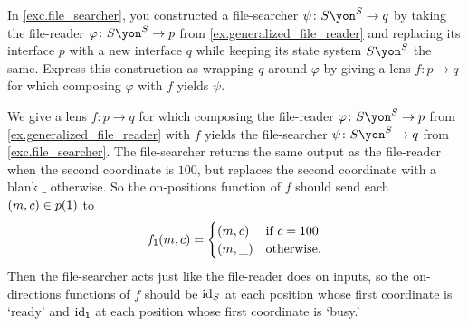 \documentclass[Book-Poly]{subfiles}
\begin{document}
\begin{exercise} \label{exc.file_searcher_wrap}
In \cref{exc.file_searcher}, you constructed a file-searcher $\psi\colon S\yon^S\to q$ by taking the file-reader $\varphi\colon S\yon^S\to p$ from \cref{ex.generalized_file_reader} and replacing its interface $p$ with a new interface $q$ while keeping its state system $S\yon^S$ the same.
Express this construction as wrapping $q$ around $\varphi$ by giving a lens $f\colon p\to q$ for which composing $\varphi$ with $f$ yields $\psi$.
\begin{solution}
We give a lens $f\colon p\to q$ for which composing the file-reader $\varphi\colon S\yon^S\to p$ from \cref{ex.generalized_file_reader} with $f$ yields the file-searcher $\psi\colon S\yon^S\to q$ from \cref{exc.file_searcher}.
The file-searcher returns the same output as the file-reader when the second coordinate is $100$, but replaces the second coordinate with a blank $\_$ otherwise.
So the on-positions function of $f$ should send each $(m,c)\in p(\textsf{1})$ to
\[
    f_{\textsf{1}}(m,c) =
        \begin{cases}
            (m,c) & \text{if } c = 100 \\
            (m,\_) & \text{otherwise}.
        \end{cases}
\]
Then the file-searcher acts just like the file-reader does on inputs, so the on-directions functions of $f$ should be $\mathrm{id}_S$ at each position whose first coordinate is `ready' and $\mathrm{id}_{\textsf{1}}$ at each position whose first coordinate is `busy.'
\end{solution}
\end{exercise}
\end{document}
